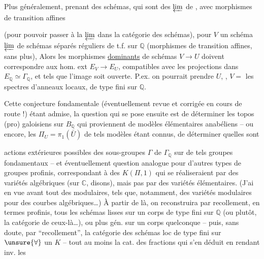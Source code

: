 Plus généralement, prenant  des schémas,  qui sont des $\varprojlim$ de   , avec morphismes de transition  affines

(pour pouvoir passer à la $\varprojlim$ dans la catégorie des schémas), pour $V$ un schéma $\varprojlim$ de schémas séparés réguliers de t.f. sur $\mathbb{Q}$ (morphismes de transition affines, sans plus), Alors les morphismes \uline{dominants} de schémas $V\longrightarrow U$ doivent correspondre aux hom. ext $E_V\longrightarrow E_U$, compatibles avec les projections dans $E_{\mathbb{Q}}\simeq\Gamma_{\mathbb{Q}}$, et tels que l'image soit ouverte. P.ex. on pourrait prendre  $U$, , $V=$ les spectres d'anneaux locaux,  de type fini sur $\mathbb{Q}$.


Cette conjecture fondamentale (éventuellement revue et corrigée en cours de route !) étant admise, la question qui se pose ensuite est de déterminer les topos (pro) galoisiens sur $B_{\mathbb{Q}}$ qui proviennent de modèles élémentaires anabéliens -- ou encore, les $\Pi_U=\pi_1(\bar U)$ de tels modèles étant connus, de déterminer quelles sont

actions extérieures possibles des sous-groupes $\Gamma$ de $\Gamma_{\mathbb{Q}}$ sur de tels groupes fondamentaux -- et éventuellement question analogue pour d'autres types de groupes profinis, correspondant à des $K(\Pi,1)$ qui se réaliseraient par des variétés algébriques (sur $\mathbb{C}$, disons), mais pas par des variétés élémentaires. (J'ai en vue avant tout des   modulaires, tels que, notamment, des variétés modulaires pour des courbes algébriques\ldots) À partir de là, on reconstruira par recollement, en termes profinis, tous les schémas lisses sur un corps de type fini sur $\mathbb{Q}$ (ou plutôt, la catégorie de ceux-là\ldots), ou plus gén. sur un corps quelconque -- puis, sans doute, par ``recollement'', la catégorie des schémas loc de type fini sur $\unsure{\forall}$ un $K$ -- tout au moins la cat. des fractions qui s'en déduit en  rendant inv. les

